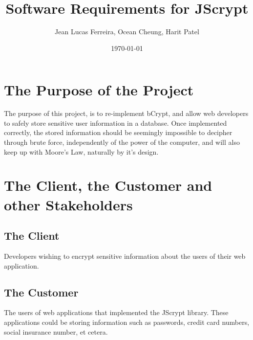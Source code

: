 \documentclass[12pt]{article}
\begin{document}
\title{Software Requirements for JScrypt} 
\author{Jean Lucas Ferreira, Ocean Cheung, Harit Patel}

\date{\today}
	
\maketitle


\newpage
  \tableofcontents

\newpage
 
\section*{}
\section{The Purpose of the Project}
 
The purpose of this project, is to re-implement bCrypt, and allow web developers to safely store sensitive user information in a database. Once implemented correctly, the stored information should be seemingly impossible to decipher through brute force, independently of the power of the computer, and will also keep up with Moore’s Law, naturally by it’s design. 
 

\section{The Client, the Customer and other Stakeholders}

\subsection{The Client}
Developers wishing to encrypt sensitive information about the users of their web application.

\subsection{The Customer}
The users of web applications that implemented the JScrypt library. These applications could be storing information such as passwords, credit card numbers, social insurance number, et cetera.
\end{document}
